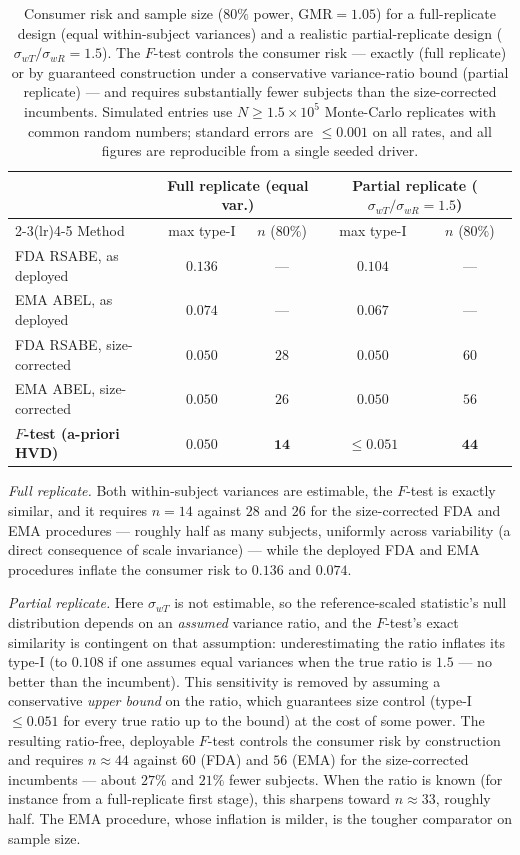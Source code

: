 \documentclass[11pt]{article}
\theoremstyle{remark}
\begin{document}
\begin{table}[t]
\centering
\caption{Consumer risk and sample size ($80\%$ power, $\mathrm{GMR}=1.05$) for a full-replicate design (equal within-subject variances) and a realistic partial-replicate design ($\sigma_{wT}/\sigma_{wR}=1.5$). The $F$-test controls the consumer risk --- exactly (full replicate) or by guaranteed construction under a conservative variance-ratio bound (partial replicate) --- and requires substantially fewer subjects than the size-corrected incumbents. Simulated entries use $N\ge 1.5\times10^5$ Monte-Carlo replicates with common random numbers; standard errors are $\le 0.001$ on all rates, and all figures are reproducible from a single seeded driver.}
\label{tab:compare}
\begin{tabular}{lcccc}
\toprule
 & \multicolumn{2}{c}{Full replicate (equal var.)} & \multicolumn{2}{c}{Partial replicate ($\sigma_{wT}/\sigma_{wR}{=}1.5$)} \\
\cmidrule(lr){2-3}\cmidrule(lr){4-5}
Method & max type-I & $n$ ($80\%$) & max type-I & $n$ ($80\%$) \\
\midrule
FDA RSABE, as deployed & $0.136$ & --- & $0.104$ & --- \\
EMA ABEL, as deployed & $0.074$ & --- & $0.067$ & --- \\
FDA RSABE, size-corrected & $0.050$ & $28$ & $0.050$ & $60$ \\
EMA ABEL, size-corrected & $0.050$ & $26$ & $0.050$ & $56$ \\
\textbf{$F$-test (a-priori HVD)} & $\mathbf{0.050}$ & $\mathbf{14}$ & $\le\mathbf{0.051}$ & $\mathbf{44}$ \\
\bottomrule
\end{tabular}
\end{table}

\emph{Full replicate.} Both within-subject variances are estimable, the $F$-test is exactly similar, and it requires $n=14$ against $28$ and $26$ for the size-corrected FDA and EMA procedures --- roughly half as many subjects, uniformly across variability (a direct consequence of scale invariance) --- while the deployed FDA and EMA procedures inflate the consumer risk to $0.136$ and $0.074$.

\emph{Partial replicate.} Here $\sigma_{wT}$ is not estimable, so the reference-scaled statistic's null distribution depends on an \emph{assumed} variance ratio, and the $F$-test's exact similarity is contingent on that assumption: underestimating the ratio inflates its type-I (to $0.108$ if one assumes equal variances when the true ratio is $1.5$ --- no better than the incumbent). This sensitivity is removed by assuming a conservative \emph{upper bound} on the ratio, which guarantees size control (type-I $\le 0.051$ for every true ratio up to the bound) at the cost of some power. The resulting ratio-free, deployable $F$-test controls the consumer risk by construction and requires $n\approx 44$ against $60$ (FDA) and $56$ (EMA) for the size-corrected incumbents --- about $27\%$ and $21\%$ fewer subjects. When the ratio is known (for instance from a full-replicate first stage), this sharpens toward $n\approx 33$, roughly half. The EMA procedure, whose inflation is milder, is the tougher comparator on sample size.
\end{document}

